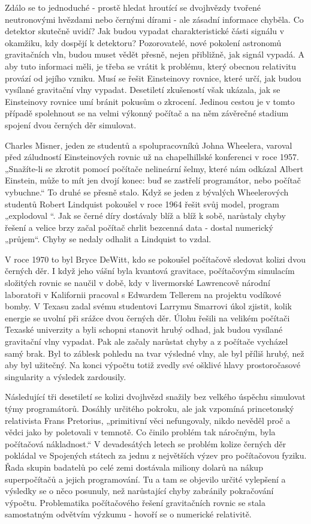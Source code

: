   Zdálo se to jednoduché - prostě hledat hroutící se dvojhvězdy tvořené neutronovými hvězdami nebo
  černými dírami - ale zásadní informace chyběla. Co detektor skutečně uvidí? Jak budou vypadat
  charakteristické části signálu v okamžiku, kdy dospějí k detektoru? Pozorovatelé, nové pokolení
  astronomů gravitačních vln, budou muset vědět přesně, nejen přibližně, jak signál vypadá. A aby
  tuto informaci měli, je třeba se vrátit k problému, který obecnou relativitu provází od jejího
  vzniku. Musí se řešit Einsteinovy rovnice, které určí, jak budou vysílané gravitační vlny vypadat.
  Desetiletí zkušeností však ukázala, jak se Einsteinovy rovnice umí bránit pokusům o zkrocení.
  Jedinou cestou je v tomto případě spolehnout se na velmi výkonný počítač a na něm závěrečné
  stadium spojení dvou černých děr simulovat. 

  Charles Misner, jeden ze studentů a spolupracovníků Johna Wheelera, varoval před záludností
  Einsteinových rovnic už na chapelhillské konferenci v roce 1957. „Snažíte-li se zkrotit pomocí
  počítače nelineární šelmy, které nám odkázal Albert Einstein, může to mít jen dvojí konec: buď se
  zastřelí programátor, nebo počítač vybuchne.“ To druhé se přesně stalo. Když se jeden z bývalých
  Wheelerových studentů Robert Lindquist pokoušel v roce 1964 řešit svůj model, program „explodoval
  “. Jak se černé díry dostávaly blíž a blíž k sobě, narůstaly chyby řešení a velice brzy začal
  počítač chrlit bezcenná data - dostal numerický „průjem“. Chyby se nedaly odhalit a Lindquist to
  vzdal. 

  V roce 1970 to byl Bryce DeWitt, kdo se pokoušel počítačově sledovat kolizi dvou černých děr. I
  když jeho vášní byla kvantová gravitace, počítačovým simulacím složitých rovnic se naučil v době,
  kdy v livermorské Lawrencově národní laboratoři v Kalifornii pracoval s Edwardem Tellerem na
  projektu vodíkové bomby. V Texasu zadal svému studentovi Larrymu Smarrovi úkol zjistit, kolik
  energie se uvolní při srážce dvou černých děr. Úlohu řešili na velikém počítači Texaské univerzity
  a byli schopni stanovit hrubý odhad, jak budou vysílané gravitační vlny vypadat. Pak ale začaly
  narůstat chyby a z počítače vycházel samý brak. Byl to záblesk pohledu na tvar výsledné vlny, ale
  byl příliš hrubý, než aby byl užitečný. Na konci výpočtu totiž zvedly své ošklivé hlavy
  prostoročasové singularity a výsledek zardousily. 

  Následující tři desetiletí se kolizi dvojhvězd snažily bez velkého úspěchu simulovat týmy
  programátorů. Dosáhly určitého pokroku, ale jak vzpomíná princetonský relativista Frans Pretorius,
  „primitivní věci nefungovaly, nikdo nevěděl proč a vědci jako by poletovali v temnotě. Co činilo
  problém tak náročným, byla počítačová nákladnost.“ V devadesátých letech se problém kolize černých
  děr pokládal ve Spojených státech za jednu z největších výzev pro počítačovou fyziku. Řada skupin
  badatelů po celé zemi dostávala miliony dolarů na nákup superpočítačů a jejich programování. Tu a
  tam se objevilo určité vylepšení a výsledky se o něco posunuly, než narůstající chyby zabránily
  pokračování výpočtu. Problematika počítačového řešení gravitačních rovnic se stala samostatným
  odvětvím výzkumu - hovoří se o numerické relativitě.

